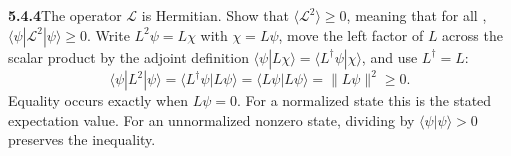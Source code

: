 \par\bigskip
\noindent\textbf{5.4.4}\quad The operator $\mathcal{L}$ is Hermitian. Show
that $\langle\mathcal{L}^{2}\rangle\ge0$, meaning that for all
,
$\langle\psi|\mathcal{L}^{2}|\psi\rangle\ge0$.
\solution
{}
Write $L^2\psi=L\chi$ with $\chi=L\psi$, move the left factor of $L$
across the scalar product by the adjoint definition
$\langle\psi|L\chi\rangle=\langle L^\dagger\psi|\chi\rangle$, and use
$L^\dagger=L$:
\[
\boxed{\langle\psi|L^2|\psi\rangle
=\langle L^\dagger\psi|L\psi\rangle
=\langle L\psi|L\psi\rangle=\|L\psi\|^2\ge0.}
\]
Equality occurs exactly when $L\psi=0$. For a normalized state this is
the stated expectation value. For an unnormalized nonzero state, dividing
by $\langle\psi|\psi\rangle>0$ preserves the inequality.

